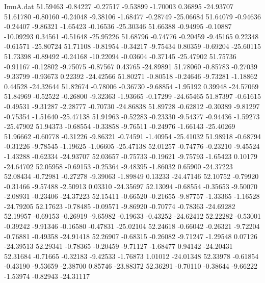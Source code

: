 \begin{filecontents}{ImuA.dat}
  51.59463   -0.84227   -0.27517   -9.53899   -1.70003    0.36895  -24.93707
  51.61780   -0.80160   -0.24048   -9.38106   -1.68477   -0.28749  -25.06684
  51.64079   -0.94636   -0.24407   -9.86321   -1.65423   -0.16536  -25.30346
  51.66388   -0.94995   -0.10887  -10.09293    0.34561   -0.51648  -25.95226
  51.68796   -0.74776   -0.20459   -9.45165    0.22348   -0.61571  -25.80724
  51.71108   -0.81954   -0.34217   -9.75434    0.80359   -0.69204  -25.60115
  51.73398   -0.89492   -0.24168  -10.22094   -0.03604   -0.37145  -25.47902
  51.75736   -0.91167   -0.12802   -9.75075   -0.87567    0.43765  -24.89891
  51.78060   -0.85783   -0.27039   -9.33799   -0.93673    0.22392  -24.42566
  51.80271   -0.80518   -0.24646   -9.73281   -1.18862    0.44528  -24.32644
  51.82674   -0.78006   -0.36730   -9.68854   -1.95192    0.39948  -24.57069
  51.84969   -0.52522   -0.26800   -9.32363   -1.93665   -0.17299  -24.65465
  51.87397   -0.61615   -0.49531   -9.31287   -2.28777   -0.70730  -24.86838
  51.89728   -0.62812   -0.30389   -9.81297   -0.75354   -1.51640  -25.47138
  51.91963   -0.52283   -0.23330   -9.54377   -0.94436   -1.59273  -25.47902
  51.94373   -0.68554   -0.33858   -9.76511   -0.24976   -1.66143  -25.40269
  51.96662   -0.60778   -0.31226   -9.86321   -0.74591   -1.40954  -25.41032
  51.98918   -0.68794   -0.31226   -9.78545   -1.19625   -1.06605  -25.47138
  52.01257   -0.74776   -0.23210   -9.45524   -1.43288   -0.62334  -24.93707
  52.03657   -0.75733   -0.19621   -9.75793   -1.65423    0.10179  -24.64702
  52.05958   -0.69153   -0.25364   -9.48395   -1.86032    0.65900  -24.37223
  52.08434   -0.72981   -0.27278   -9.39063   -1.89849    0.13233  -24.47146
  52.10752   -0.79920   -0.31466   -9.57488   -2.50913    0.03310  -24.35697
  52.13094   -0.68554   -0.35653   -9.50070   -2.08931   -0.23406  -24.37223
  52.15411   -0.66520   -0.21655   -9.87757   -1.33365   -1.16528  -24.79205
  52.17623   -0.78485   -0.09571   -9.86920   -0.70774   -0.78363  -24.69282
  52.19957   -0.69153   -0.26919   -9.65982   -0.19633   -0.43252  -24.62412
  52.22282   -0.53001   -0.39242   -9.91346   -0.16580   -0.47831  -25.02104
  52.24618   -0.66042   -0.26321   -9.72204   -0.76881   -0.49358  -24.91418
  52.26907   -0.68315   -0.26082   -9.71247   -1.29548    0.07126  -24.39513
  52.29341   -0.78365   -0.20459   -9.71127   -1.68477    0.94142  -24.20431
  52.31684   -0.71665   -0.32183   -9.42533   -1.76873    1.01012  -24.01348
  52.33978   -0.61854   -0.43190   -9.53659   -2.38700    0.85746  -23.88372
  52.36291   -0.70110   -0.38644   -9.66222   -1.53974   -0.82943  -24.31117

\end{filecontents}
